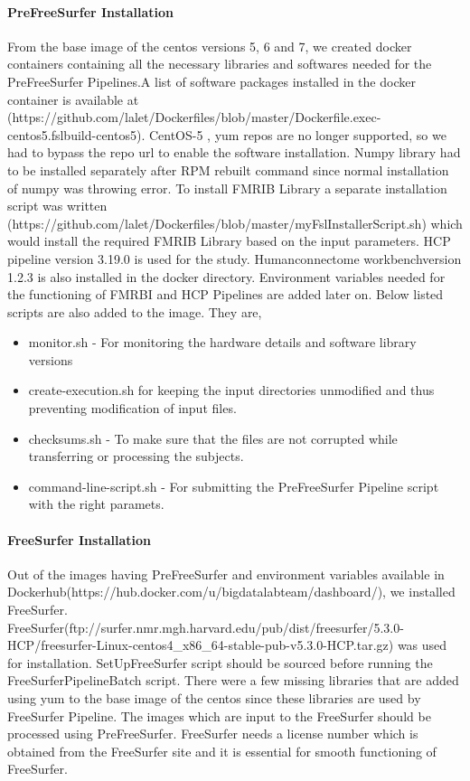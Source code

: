 \documentclass{article}
\begin{document}
\paragraph{PreFreeSurfer Installation}
From the base image of the centos versions 5, 6 and 7, we created docker containers containing all the necessary libraries and softwares needed for the PreFreeSurfer Pipelines.A list of software packages installed in the docker container is available at (https://github.com/lalet/Dockerfiles/blob/master/Dockerfile.exec-centos5.fslbuild-centos5). CentOS-5 , yum repos are no longer supported, so we had to bypass the repo url to enable the software installation. Numpy library had to be installed separately after RPM rebuilt command since normal installation of numpy was throwing error. To install FMRIB Library a separate installation script was written (https://github.com/lalet/Dockerfiles/blob/master/myFslInstallerScript.sh) which would install the required FMRIB Library based on the input parameters. HCP pipeline version 3.19.0 is used for the study. Humanconnectome workbenchversion 1.2.3 is also installed in the docker directory. Environment variables needed for the functioning of FMRBI and HCP Pipelines are added later on.
Below listed scripts are also added to the image. They are,
\begin{itemize}
  \item monitor.sh - For monitoring the hardware details and software library versions
  \item create-execution.sh for keeping the input directories unmodified and thus preventing modification of input files.
  \item checksums.sh - To make sure that the files are not corrupted while transferring or processing the subjects.
  \item command-line-script.sh - For submitting the PreFreeSurfer Pipeline script with the right paramets.
\end{itemize}


\paragraph{FreeSurfer Installation}
Out of the images having PreFreeSurfer and environment variables available in Dockerhub(https://hub.docker.com/u/bigdatalabteam/dashboard/), we installed FreeSurfer. FreeSurfer(ftp://surfer.nmr.mgh.harvard.edu/pub/dist/freesurfer/5.3.0-HCP/freesurfer-Linux-centos4\_x86\_64-stable-pub-v5.3.0-HCP.tar.gz) was used for installation. SetUpFreeSurfer script should be sourced before running the FreeSurferPipelineBatch script. There were a few missing libraries that are added using yum to the base image of the centos since these libraries are used by FreeSurfer Pipeline. The images which are input to the FreeSurfer should be processed using PreFreeSurfer. FreeSurfer needs a license number which is obtained from the FreeSurfer site and it is essential for smooth functioning of FreeSurfer. 
\end{document}
